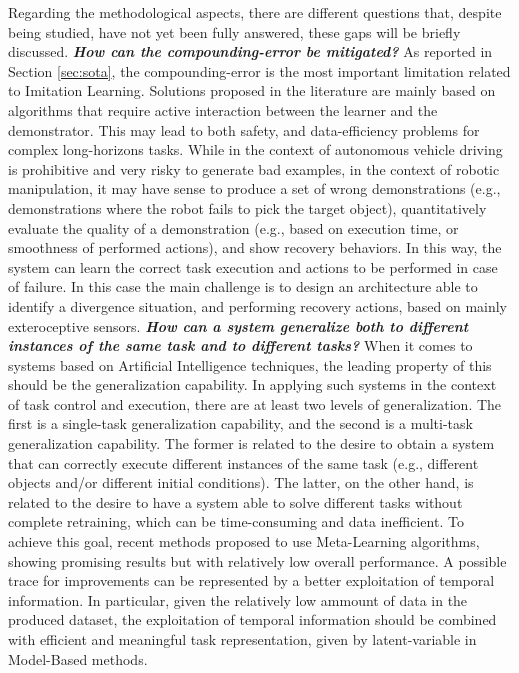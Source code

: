 Regarding the methodological aspects, there are different questions that, despite being studied, have not yet been fully answered, these gaps will be briefly discussed.
\newline \textbf{\textit{How can the compounding-error be mitigated?}} As reported in Section \ref{sec:sota}, the compounding-error is the most important limitation related to Imitation Learning. Solutions proposed in the literature are mainly based on algorithms that require active interaction between the learner and the demonstrator. This may lead to both safety, and data-efficiency problems for complex long-horizons tasks. While in the context of autonomous vehicle driving is prohibitive and very risky to generate bad examples, in the context of robotic manipulation, it may have sense to produce a set of wrong demonstrations (e.g., demonstrations where the robot fails to pick the target object), quantitatively evaluate the quality of a demonstration (e.g., based on execution time, or smoothness of performed actions), and show recovery behaviors. In this way, the system can learn the correct task execution and actions to be performed in case of failure. In this case the main challenge is to design an architecture able to identify a divergence situation, and performing recovery actions, based on mainly exteroceptive sensors. 
\newline \textbf{\textit{How can a system generalize both to different instances of the same task and to different tasks?}} When it comes to systems based on Artificial Intelligence techniques, the leading property of this should be the generalization capability. In applying such systems in the context of task control and execution, there are at least two levels of generalization. The first is a single-task generalization capability, and the second is a multi-task generalization capability. The former is related to the desire to obtain a system that can correctly execute different instances of the same task (e.g., different objects and/or different initial conditions). The latter, on the other hand, is related to the desire to have a system able to solve different tasks without complete retraining, which can be time-consuming and data inefficient. To achieve this goal, recent methods proposed to use Meta-Learning algorithms, showing promising results but with relatively low overall performance. A possible trace for improvements can be represented by a better exploitation of temporal information. In particular, given the relatively low ammount of data in the produced dataset, the exploitation of temporal information should be combined with efficient and meaningful task representation, given by latent-variable in Model-Based methods.

